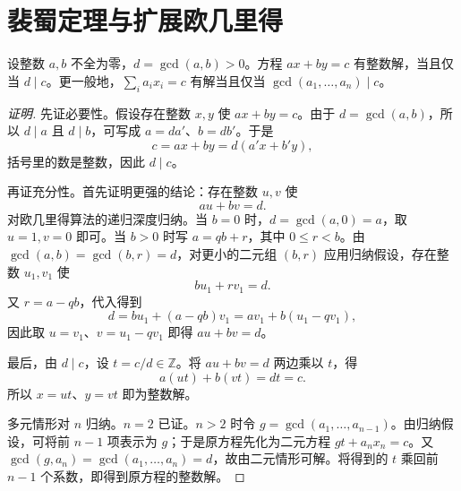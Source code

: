 \section{裴蜀定理与扩展欧几里得}
\begin{theorem}[裴蜀定理]
设整数 $a,b$ 不全为零，$d=\gcd(a,b)>0$。方程 $ax+by=c$ 有整数解，当且仅当 $d\mid c$。更一般地，$\sum_i a_ix_i=c$ 有解当且仅当 $\gcd(a_1,\ldots,a_n)\mid c$。
\end{theorem}

\begin{proof}[证明]
先证必要性。假设存在整数 $x,y$ 使 $ax+by=c$。由于 $d=\gcd(a,b)$，所以 $d\mid a$ 且 $d\mid b$，可写成 $a=da'$、$b=db'$。于是
\[
 c=ax+by=d(a'x+b'y),
\]
括号里的数是整数，因此 $d\mid c$。

再证充分性。首先证明更强的结论：存在整数 $u,v$ 使
\[
 au+bv=d.
\]
对欧几里得算法的递归深度归纳。当 $b=0$ 时，$d=\gcd(a,0)=a$，取 $u=1,v=0$ 即可。当 $b>0$ 时写 $a=qb+r$，其中 $0\le r<b$。由 $\gcd(a,b)=\gcd(b,r)=d$，对更小的二元组 $(b,r)$ 应用归纳假设，存在整数 $u_1,v_1$ 使
\[
 bu_1+rv_1=d.
\]
又 $r=a-qb$，代入得到
\[
 d=bu_1+(a-qb)v_1=av_1+b(u_1-qv_1),
\]
因此取 $u=v_1$、$v=u_1-qv_1$ 即得 $au+bv=d$。

最后，由 $d\mid c$，设 $t=c/d\in\mathbb Z$。将 $au+bv=d$ 两边乘以 $t$，得
\[
 a(ut)+b(vt)=dt=c.
\]
所以 $x=ut$、$y=vt$ 即为整数解。

多元情形对 $n$ 归纳。$n=2$ 已证。$n>2$ 时令 $g=\gcd(a_1,\ldots,a_{n-1})$。由归纳假设，可将前 $n-1$ 项表示为 $g$；于是原方程先化为二元方程 $gt+a_nx_n=c$。又 $\gcd(g,a_n)=\gcd(a_1,\ldots,a_n)=d$，故由二元情形可解。将得到的 $t$ 乘回前 $n-1$ 个系数，即得到原方程的整数解。
\end{proof}

